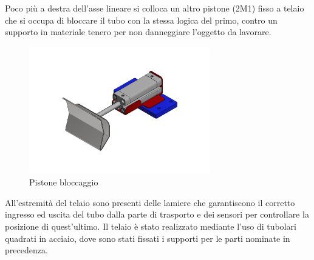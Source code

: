 \documentclass{report}
\begin{document}
Poco più a destra dell’asse lineare si colloca un altro pistone (2M1) fisso a telaio che si occupa di bloccare il tubo con la stessa logica del primo, contro un supporto in materiale tenero per non danneggiare l’oggetto da lavorare.
\begin{figure}[H]
  \centering
  \includegraphics[width=0.7\textwidth]{src/img/pinza.pdf}
  \caption{Pistone bloccaggio}
  \label{fig:pinzaggio}
\end{figure}
All’estremità del telaio sono presenti delle lamiere che garantiscono il corretto ingresso ed uscita del tubo dalla parte di trasporto e dei sensori per controllare la posizione di quest’ultimo. Il telaio è stato realizzato mediante l’uso di tubolari quadrati in acciaio, dove sono stati fissati i supporti per le parti nominate in precedenza.
\end{document}

